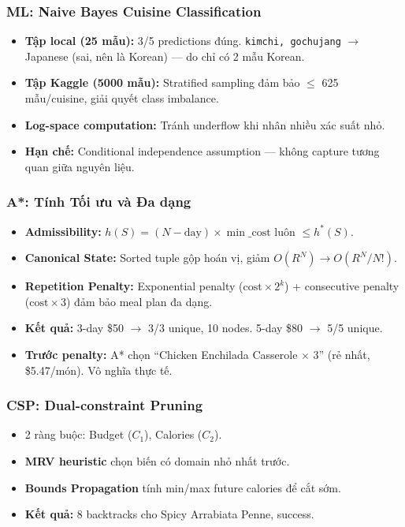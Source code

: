 \subsubsection{ML: Naive Bayes Cuisine Classification}
\begin{itemize}
  \item \textbf{Tập local (25 mẫu):} 3/5 predictions đúng. \texttt{kimchi, gochujang} $\to$ Japanese (sai, nên là Korean) --- do chỉ có 2 mẫu Korean.
  \item \textbf{Tập Kaggle (5000 mẫu):} Stratified sampling đảm bảo $\leq$ 625 mẫu/cuisine, giải quyết class imbalance.
  \item \textbf{Log-space computation:} Tránh underflow khi nhân nhiều xác suất nhỏ.
  \item \textbf{Hạn chế:} Conditional independence assumption --- không capture tương quan giữa nguyên liệu.
\end{itemize}

\subsubsection{A*: Tính Tối ưu và Đa dạng}
\begin{itemize}
  \item \textbf{Admissibility:} $h(S) = (N - \text{day}) \times \min\_\text{cost}$ luôn $\leq h^*(S)$.
  \item \textbf{Canonical State:} Sorted tuple gộp hoán vị, giảm $O(R^N) \to O(R^N / N!)$.
  \item \textbf{Repetition Penalty:} Exponential penalty ($\text{cost} \times 2^k$) + consecutive penalty ($\text{cost} \times 3$) đảm bảo meal plan đa dạng.
  \item \textbf{Kết quả:} 3-day \$50 $\to$ 3/3 unique, 10 nodes. 5-day \$80 $\to$ 5/5 unique.
  \item \textbf{Trước penalty:} A* chọn ``Chicken Enchilada Casserole $\times$ 3'' (rẻ nhất, \$5.47/món). Vô nghĩa thực tế.
\end{itemize}

\subsubsection{CSP: Dual-constraint Pruning}
\begin{itemize}
  \item 2 ràng buộc: Budget ($C_1$), Calories ($C_2$).
  \item \textbf{MRV heuristic} chọn biến có domain nhỏ nhất trước.
  \item \textbf{Bounds Propagation} tính min/max future calories để cắt sớm.
  \item \textbf{Kết quả:} 8 backtracks cho Spicy Arrabiata Penne, success.
\end{itemize}

